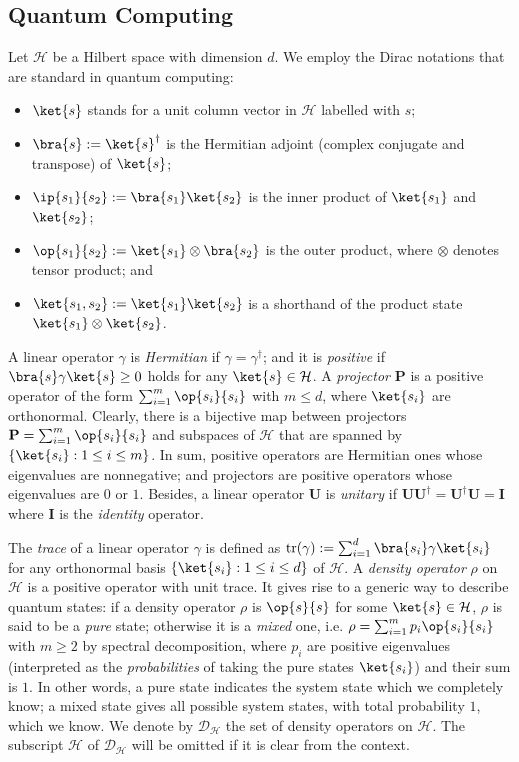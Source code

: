 \documentclass[a4paper,UKenglish,cleveref,autoref,thm-restate,authorcolumns]{lipics-v2019}
\newcommand{\h}{\mathcal{H}}
\newcommand{\D}{\mathcal{D}}
\newcommand{\PP}{\mathbf{P}}
\newcommand{\id}{\mathbf{I}}
\newcommand{\tr}{\mathrm{tr}}
\begin{document}
\subsection{Quantum Computing}
Let $\h$ be a Hilbert space with dimension $d$.
We employ the Dirac notations that are standard in quantum computing:
\begin{itemize}
	\item $\ket{s}$ stands for a unit column vector in $\h$ labelled with $s$;
	\item $\bra{s}:=\ket{s}^\dag$ is the Hermitian adjoint
	(complex conjugate and transpose) of $\ket{s}$;
	\item $\ip{s_1}{s_2}:=\bra{s_1}\ket{s_2}$
	is the inner product of $\ket{s_1}$ and $\ket{s_2}$;
	\item $\op{s_1}{s_2}:=\ket{s_1} \otimes \bra{s_2}$ is the outer product,
	where $\otimes$ denotes tensor product; and
	\item $\ket{s_1,s_2}:=\ket{s_1}\ket{s_2}$ is a shorthand of
    the product state $\ket{s_1}\otimes\ket{s_2}$.
\end{itemize}

A linear operator $\gamma$ is \emph{Hermitian} if $\gamma=\gamma^\dag$;
and it is \emph{positive}
if $\bra{s}\gamma\ket{s} \ge 0$ holds for any $\ket{s}\in\h$.
A \emph{projector} $\PP$ is a positive operator of
the form $\sum_{i=1}^m \op{s_i}{s_i}$ with $m\le d$,
where $\ket{s_i}$ are orthonormal.
Clearly, there is a bijective map
between projectors $\PP=\sum_{i=1}^m \op{s_i}{s_i}$
and subspaces of $\h$ that are spanned by $\{\ket{s_i}:1 \le i \le m\}$.
In sum, positive operators are Hermitian ones
whose eigenvalues are nonnegative;
and projectors are positive operators whose eigenvalues are $0$ or $1$.
Besides, a linear operator $\mathbf{U}$ is \emph{unitary}
if $\mathbf{U}\mathbf{U}^\dag=\mathbf{U}^\dag\mathbf{U}=\id$
where $\id$ is the \emph{identity} operator.

The \emph{trace} of a linear operator $\gamma$ is defined as
$\tr(\gamma):=\sum_{i=1}^d \bra{s_i}\gamma\ket{s_i}$
for any orthonormal basis $\{\ket{s_i}:1 \le i \le d\}$ of $\h$.
A \emph{density operator} $\rho$ on $\h$
is a positive operator with unit trace.
It gives rise to a generic way to describe quantum states:
if a density operator $\rho$ is $\op{s}{s}$ for some $\ket{s}\in \h$,
$\rho$ is said to be a \emph{pure} state;
otherwise it is a \emph{mixed} one,
i.e. $\rho=\sum_{i=1}^m p_i \op{s_i}{s_i}$ with $m\ge 2$ by spectral decomposition,
where $p_i$ are positive eigenvalues
(interpreted as the \emph{probabilities} of taking the pure states $\ket{s_i}$)
and their sum is $1$.
In other words, a pure state indicates the system state which we completely know;
a mixed state gives all possible system states, with total probability $1$, which we know.
We denote by $\D_\h$ the set of density operators on $\h$.
The subscript $\h$ of $\D_\h$ will be omitted if it is clear from the context. 
\end{document}
